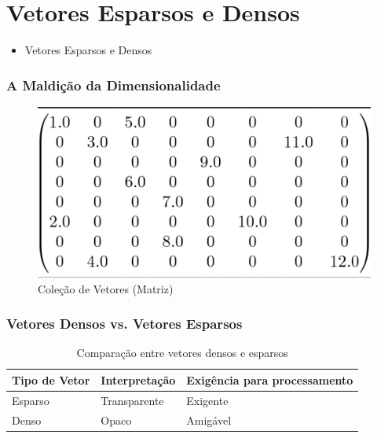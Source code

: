 \documentclass{beamer}
\begin{document}

\section{Vetores Esparsos e Densos}

\begin{frame}
\begin{itemize}
    \item \Large{Vetores Esparsos e Densos}

\end{itemize}

\end{frame}

\begin{frame}
\frametitle{A Maldição da Dimensionalidade}
\begin{figure}
	\centering
	\includegraphics[width=0.7\linewidth]{spM}
	\caption{Coleção de Vetores (Matriz)}
	\label{fig:spm}
\end{figure}

\end{frame}


\begin{frame}
\frametitle{Vetores Densos vs. Vetores Esparsos}
\begin{table}
	\begin{tabular}{l l l}
		\toprule
		\textbf{Tipo de Vetor} & \textbf{Interpretação} & \textbf{Exigência para processamento}\\
		\midrule
		Esparso & Transparente & Exigente \\
		Denso & Opaco & Amigável \\
		\bottomrule
	\end{tabular}
	\caption{Comparação entre vetores densos e esparsos}
\end{table}
\end{frame}
\end{document}
